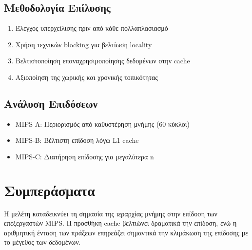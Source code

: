 \documentclass[11pt,a4paper]{article}
\begin{document}
\subsection{Μεθοδολογία Επίλυσης}
\begin{enumerate}
    \item Έλεγχος υπερχείλισης πριν από κάθε πολλαπλασιασμό
    \item Χρήση τεχνικών blocking για βελτίωση locality
    \item Βελτιστοποίηση επαναχρησιμοποίησης δεδομένων στην cache
    \item Αξιοποίηση της χωρικής και χρονικής τοπικότητας
\end{enumerate}

\subsection{Ανάλυση Επιδόσεων}
\begin{itemize}
    \item MIPS-A: Περιορισμός από καθυστέρηση μνήμης (60 κύκλοι)
    \item MIPS-B: Βέλτιστη επίδοση λόγω L1 cache
    \item MIPS-C: Διατήρηση επίδοσης για μεγαλύτερα n
\end{itemize}

\section{Συμπεράσματα}
Η μελέτη καταδεικνύει τη σημασία της ιεραρχίας μνήμης στην επίδοση των επεξεργαστών MIPS. Η προσθήκη cache βελτιώνει δραματικά την επίδοση, ενώ η αριθμητική ένταση των πράξεων επηρεάζει σημαντικά την κλιμάκωση της επίδοσης με το μέγεθος των δεδομένων.
\end{document}
